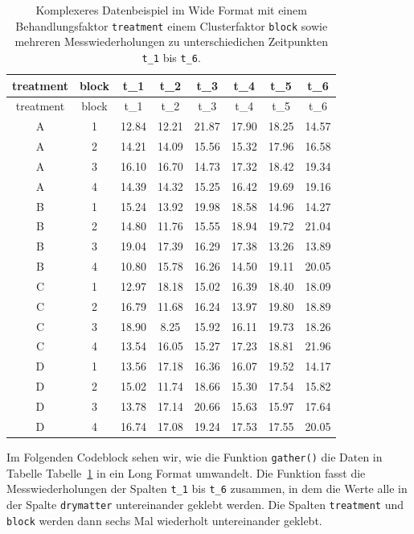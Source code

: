 \documentclass[
  letterpaper,
  DIV=11,
  oneside]{scrreport}
\begin{document}
\hypertarget{tbl-imp-complex-long}{}
\begin{longtable}[]{@{}cccccccc@{}}
\caption{\label{tbl-imp-complex-long}Komplexeres Datenbeispiel im Wide
Format mit einem Behandlungsfaktor \texttt{treatment} einem
Clusterfaktor \texttt{block} sowie mehreren Messwiederholungen zu
unterschiedichen Zeitpunkten \texttt{t\_1} bis
\texttt{t\_6}.}\tabularnewline
\toprule()
treatment & block & t\_1 & t\_2 & t\_3 & t\_4 & t\_5 & t\_6 \\
\midrule()
\endfirsthead
\toprule()
treatment & block & t\_1 & t\_2 & t\_3 & t\_4 & t\_5 & t\_6 \\
\midrule()
\endhead
A & 1 & 12.84 & 12.21 & 21.87 & 17.90 & 18.25 & 14.57 \\
A & 2 & 14.21 & 14.09 & 15.56 & 15.32 & 17.96 & 16.58 \\
A & 3 & 16.10 & 16.70 & 14.73 & 17.32 & 18.42 & 19.34 \\
A & 4 & 14.39 & 14.32 & 15.25 & 16.42 & 19.69 & 19.16 \\
B & 1 & 15.24 & 13.92 & 19.98 & 18.58 & 14.96 & 14.27 \\
B & 2 & 14.80 & 11.76 & 15.55 & 18.94 & 19.72 & 21.04 \\
B & 3 & 19.04 & 17.39 & 16.29 & 17.38 & 13.26 & 13.89 \\
B & 4 & 10.80 & 15.78 & 16.26 & 14.50 & 19.11 & 20.05 \\
C & 1 & 12.97 & 18.18 & 15.02 & 16.39 & 18.40 & 18.09 \\
C & 2 & 16.79 & 11.68 & 16.24 & 13.97 & 19.80 & 18.89 \\
C & 3 & 18.90 & 8.25 & 15.92 & 16.11 & 19.73 & 18.26 \\
C & 4 & 13.54 & 16.05 & 15.27 & 17.23 & 18.81 & 21.96 \\
D & 1 & 13.56 & 17.18 & 16.36 & 16.07 & 19.52 & 14.17 \\
D & 2 & 15.02 & 11.74 & 18.66 & 15.30 & 17.54 & 15.82 \\
D & 3 & 13.78 & 17.14 & 20.66 & 15.63 & 15.97 & 17.64 \\
D & 4 & 16.74 & 17.08 & 19.24 & 17.53 & 17.55 & 20.05 \\
\bottomrule()
\end{longtable}

Im Folgenden Codeblock sehen wir, wie die Funktion \texttt{gather()} die
Daten in Tabelle Tabelle~\ref{tbl-imp-complex-long} in ein Long Format
umwandelt. Die Funktion fasst die Messwiederholungen der Spalten
\texttt{t\_1} bis \texttt{t\_6} zusammen, in dem die Werte alle in der
Spalte \texttt{drymatter} untereinander geklebt werden. Die Spalten
\texttt{treatment} und \texttt{block} werden dann sechs Mal wiederholt
untereinander geklebt.
\end{document}
